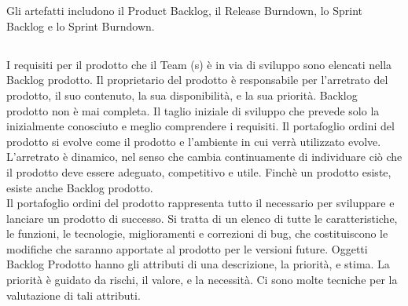 \section*{\color{Blue}{ARTEFATTI}}
\label{sec:artifacts}
Gli artefatti includono il Product Backlog, il Release Burndown, lo Sprint Backlog e lo Sprint Burndown.

\subsection*{\color{Blue}{PRODUCT BACKLOG E RELEASE BURNDOWN}}
\label{sec:productbacklog}
I requisiti per il prodotto che il Team (s) \`e in via di sviluppo sono elencati nella Backlog prodotto. Il
proprietario del prodotto \`e responsabile per l'arretrato del prodotto, il suo contenuto, la sua disponibilit\`a, e la
sua priorit\`a. Backlog prodotto non \`e mai completa. Il taglio iniziale di sviluppo che prevede solo la inizialmente
conosciuto e meglio comprendere i requisiti. Il portafoglio ordini del prodotto si evolve come il prodotto e l'ambiente
in cui verr\`a utilizzato evolve. L'arretrato \`e dinamico, nel senso che cambia continuamente di individuare ci\`o che
il prodotto deve essere adeguato, competitivo e utile. Finch\`e un prodotto esiste, esiste anche Backlog prodotto.\\
\linebreak 
Il portafoglio ordini del prodotto rappresenta tutto il necessario per sviluppare e lanciare un prodotto di
successo. Si tratta di un elenco di tutte le caratteristiche, le funzioni, le tecnologie, miglioramenti e correzioni di
bug, che costituiscono le modifiche che saranno apportate al prodotto per le versioni future. Oggetti Backlog Prodotto
hanno gli attributi di una descrizione, la priorit\`a, e stima. La priorit\`a \`e guidato da rischi, il valore, e la
necessit\`a. Ci sono molte tecniche per la valutazione di tali attributi.

\vspace{0.4cm}
\vspace{0.4cm}
\linebreak

